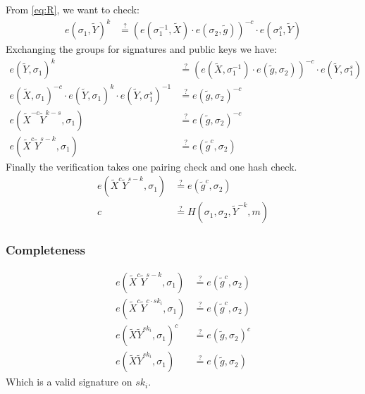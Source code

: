 \documentclass[11pt]{article}
\newenvironment{optimization}{\par\color{blue}}{\par}
\begin{document}
    \begin{optimization}
        From \ref{eq:R}, we want to check:
        \begin{align}
            e(\sigma_1, \tilde{Y})^{k} & \stackrel{?}{=}(e(\sigma_1^{-1}, \tilde{X})\cdot e(\sigma_2, \tilde{g}))^{-c}\cdot e(\sigma_1^s, \tilde{Y})
        \end{align}
        Exchanging the groups for signatures and public keys we have:
        \begin{align}
            e( \tilde{Y},\sigma_1)^{k} & \stackrel{?}{=}(e(\tilde{X},\sigma_1^{-1})\cdot e( \tilde{g},\sigma_2))^{-c}\cdot e( \tilde{Y},\sigma_1^s)\\
            e(\tilde{X},\sigma_1)^{-c}\cdot e( \tilde{Y},\sigma_1)^{k} \cdot e( \tilde{Y},\sigma_1^s)^{-1} & \stackrel{?}{=} e( \tilde{g},\sigma_2)^{-c}\\
            e(\tilde{X}^{-c}\tilde{Y}^{k-s},\sigma_1) & \stackrel{?}{=} e( \tilde{g},\sigma_2)^{-c}\\
            e(\tilde{X}^{c}\tilde{Y}^{s-k},\sigma_1) & \stackrel{?}{=} e( \tilde{g}^{c},\sigma_2)
        \end{align}
        Finally the verification takes one pairing check and one hash check.
        \begin{align}
            e(\tilde{X}^c\tilde{Y}^{s-k}, \sigma_1)&\stackrel{?}{=}  e(\tilde{g}^c, \sigma_2)\\
            c & \stackrel{?}{=} H(\sigma_1, \sigma_2,  \tilde{Y}^{-k}, m)
        \end{align}
    \end{optimization}

    \subsubsection{Completeness}
    \begin{optimization}
        \begin{align}
            e(\tilde{X}^c\tilde{Y}^{s-k}, \sigma_1)&\stackrel{?}{=}  e(\tilde{g}^c, \sigma_2)\\
            e(\tilde{X}^c\tilde{Y}^{c\cdot sk_i}, \sigma_1)&\stackrel{?}{=}  e(\tilde{g}^c, \sigma_2)\\
            e(\tilde{X}\tilde{Y}^{sk_i}, \sigma_1)^c &\stackrel{?}{=}  e(\tilde{g}, \sigma_2)^c\\
            e(\tilde{X}\tilde{Y}^{sk_i}, \sigma_1) &\stackrel{?}{=}  e(\tilde{g}, \sigma_2)
        \end{align}
        Which is a valid signature on $sk_i$.
    \end{optimization}
\end{document}
